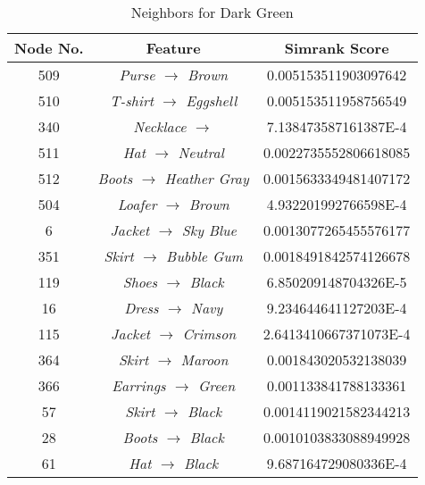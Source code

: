 \begin{table}
\centering
\caption{Neighbors for Dark Green}
\begin{tabular}{|c|c|c|}
\hline
Node No. & Feature & Simrank Score\\
\hline\hline
509 & \textit{Purse $
\rightarrow$ Brown} & 0.005153511903097642 \\
510 & \textit{T-shirt $\rightarrow$ Eggshell} & 0.005153511958756549 \\
340 & \textit{Necklace $\rightarrow$ } & 7.138473587161387E-4 \\
511 & \textit{Hat $
\rightarrow$ Neutral} & 0.0022735552806618085 \\
512 & \textit{Boots $
\rightarrow$ Heather Gray} & 0.0015633349481407172 \\
504 & \textit{Loafer $
\rightarrow$ Brown} & 4.932201992766598E-4 \\
6 & \textit{Jacket $
\rightarrow$ Sky Blue} & 0.0013077265455576177 \\
351 & \textit{Skirt $
\rightarrow$ Bubble Gum} & 0.0018491842574126678 \\
119 & \textit{Shoes $
\rightarrow$ Black} & 6.850209148704326E-5 \\
16 & \textit{Dress $
\rightarrow$ Navy} & 9.234644641127203E-4 \\
115 & \textit{Jacket $\rightarrow$ Crimson} & 2.6413410667371073E-4 \\
364 & \textit{Skirt $
\rightarrow$ Maroon} & 0.001843020532138039 \\
366 & \textit{Earrings $\rightarrow$ Green} & 0.001133841788133361 \\
57 & \textit{Skirt $
\rightarrow$ Black} & 0.0014119021582344213 \\
28 & \textit{Boots $
\rightarrow$ Black} & 0.0010103833088949928 \\
61 & \textit{Hat $
\rightarrow$ Black} & 9.687164729080336E-4 \\
\hline\end{tabular}
\label{table:neighbor2}
\end{table}

